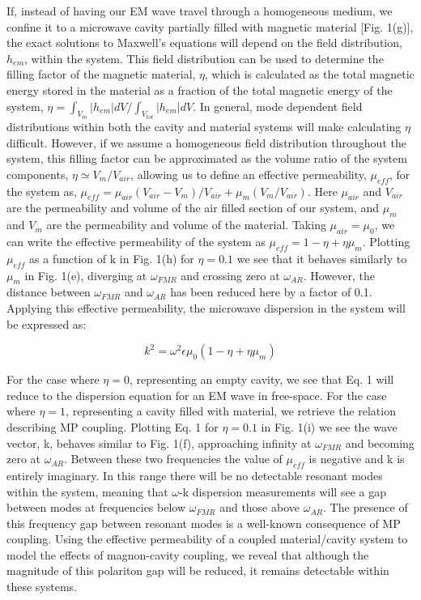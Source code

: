 \documentclass[prb,twocolumn,showpacs,preprintnumbers,amsmath,amssymb]{revtex4-1}
\begin{document}
If, instead of having our EM wave travel through a homogeneous medium, we confine it to a microwave cavity partially filled with magnetic material [Fig. 1(g)], the exact solutions to Maxwell's equations will depend on the field distribution, $h_{em}$, within the system. This field distribution can be used to determine the filling factor of the magnetic material, $\eta$, which is calculated as the total magnetic energy stored in the material as a fraction of the total magnetic energy of the system, $\eta=\int_{V_{m}}|h_{em}|dV/\int_{V_{tot}}|h_{em}|dV$. In general, mode dependent field distributions within both the cavity and material systems will make calculating $\eta$ difficult. However, if we assume a homogeneous field distribution throughout the system, this filling factor can be approximated as the volume ratio of the system components, $\eta\simeq V_{m}/V_{air}$, allowing us to define an effective permeability, $\mu_{eff}$, for the system as, $\mu_{eff}=\mu_{air}(V_{air}-V_{m})/V_{air}+\mu_{m}(V_{m}/V_{air})$. Here $\mu_{air}$ and $V_{air}$ are the permeability and volume of the air filled section of our system, and $\mu_{m}$ and $V_{m}$ are the permeability and volume of the material. Taking $\mu_{air}=\mu_{0}$, we can write the effective permeability of the system as $\mu_{eff}=1-\eta+\eta\mu_{m}$. Plotting $\mu_{eff}$ as a function of k in Fig. 1(h) for $\eta=0.1$ we see that it behaves similarly to $\mu_{m}$ in Fig. 1(e), diverging at $\omega_{FMR}$ and crossing zero at $\omega_{AR}$. However, the distance between $\omega_{FMR}$ and $\omega_{AR}$ has been reduced here by a factor of 0.1. Applying this effective permeability, the microwave dispersion in the system will be expressed as:

\begin{equation}
k^{2}=\omega^{2}\epsilon\mu_{0}(1-\eta+\eta\mu_{m})
\end{equation}

For the case where $\eta=0$, representing an empty cavity, we see that Eq. 1 will reduce to the dispersion equation for an EM wave in free-space. For the case where $\eta=1$, representing a cavity filled with material, we retrieve the relation describing MP coupling. Plotting Eq. 1 for $\eta=0.1$ in Fig. 1(i) we see the wave vector, k, behaves similar to Fig. 1(f), approaching infinity at $\omega_{FMR}$ and becoming zero at $\omega_{AR}$. Between these two frequencies the value of $\mu_{eff}$ is negative and k is entirely imaginary. In this range there will be no detectable resonant modes within the system, meaning that $\omega$-k dispersion measurements will see a gap between modes at frequencies below $\omega_{FMR}$ and those above $\omega_{AR}$. The presence of this frequency gap between resonant modes is a well-known consequence of MP coupling. Using the effective permeability of a coupled material/cavity system to model the effects of magnon-cavity coupling, we reveal that although the magnitude of this polariton gap will be reduced, it remains detectable within these systems. 
\end{document}
